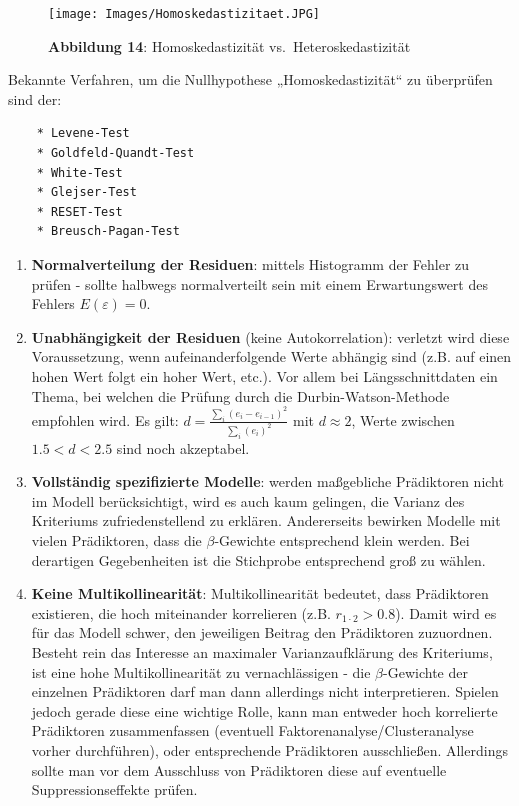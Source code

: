 \documentclass[]{article}
\begin{document}
\begin{figure}
\centering
\texttt{[image: Images/Homoskedastizitaet.JPG]}
\caption{\textbf{Abbildung 14}: Homoskedastizität vs.~Heteroskedastizität}
\end{figure}

Bekannte Verfahren, um die Nullhypothese „Homoskedastizität`` zu überprüfen sind der:

\begin{verbatim}
    * Levene-Test
    * Goldfeld-Quandt-Test
    * White-Test
    * Glejser-Test
    * RESET-Test
    * Breusch-Pagan-Test
\end{verbatim}

\begin{enumerate}
\def\labelenumi{\arabic{enumi}.}
\setcounter{enumi}{2}
\item
  \textbf{Normalverteilung der Residuen}: mittels Histogramm der Fehler zu prüfen - sollte halbwegs normalverteilt sein mit einem Erwartungswert des Fehlers \(E(\varepsilon) = 0\).
\item
  \textbf{Unabhängigkeit der Residuen} (keine Autokorrelation): verletzt wird diese Voraussetzung, wenn aufeinanderfolgende Werte abhängig sind (z.B. auf einen hohen Wert folgt ein hoher Wert, etc.). Vor allem bei Längsschnittdaten ein Thema, bei welchen die Prüfung durch die Durbin-Watson-Methode empfohlen wird. Es gilt: \(d = \frac{\sum_{i} (e_i - e_{i-1})^2}{\sum_{i} (e_i)^2}\) mit \(d \approx 2\), Werte zwischen \(1.5 < d < 2.5\) sind noch akzeptabel.
\item
  \textbf{Vollständig spezifizierte Modelle}: werden maßgebliche Prädiktoren nicht im Modell berücksichtigt, wird es auch kaum gelingen, die Varianz des Kriteriums zufriedenstellend zu erklären. Andererseits bewirken Modelle mit vielen Prädiktoren, dass die \(\beta\)-Gewichte entsprechend klein werden. Bei derartigen Gegebenheiten ist die Stichprobe entsprechend groß zu wählen.
\item
  \textbf{Keine Multikollinearität}: Multikollinearität bedeutet, dass Prädiktoren existieren, die hoch miteinander korrelieren (z.B. \(r_{1\cdot2} > 0.8\)). Damit wird es für das Modell schwer, den jeweiligen Beitrag den Prädiktoren zuzuordnen. Besteht rein das Interesse an maximaler Varianzaufklärung des Kriteriums, ist eine hohe Multikollinearität zu vernachlässigen - die \(\beta\)-Gewichte der einzelnen Prädiktoren darf man dann allerdings nicht interpretieren. Spielen jedoch gerade diese eine wichtige Rolle, kann man entweder hoch korrelierte Prädiktoren zusammenfassen (eventuell Faktorenanalyse/Clusteranalyse vorher durchführen), oder entsprechende Prädiktoren ausschließen. Allerdings sollte man vor dem Ausschluss von Prädiktoren diese auf eventuelle Suppressionseffekte prüfen.


\end{enumerate}
\end{document}
